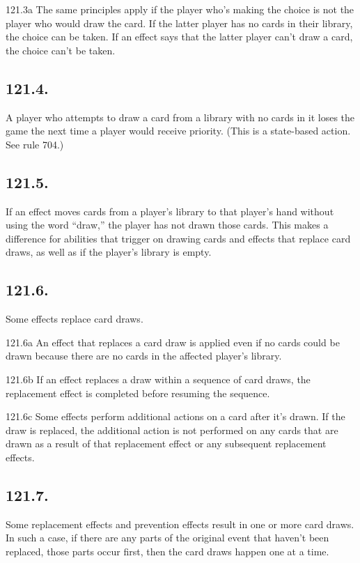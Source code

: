 121.3a The same principles apply if the player who’s making the choice is not the player who would draw the card. If the latter player has no cards in their library, the choice can be taken. If an effect says that the latter player can’t draw a card, the choice can’t be taken.

\subsection*{121.4.}
A player who attempts to draw a card from a library with no cards in it loses the game the next time a player would receive priority. (This is a state-based action. See rule 704.)

\subsection*{121.5.}
If an effect moves cards from a player’s library to that player’s hand without using the word “draw,” the player has not drawn those cards. This makes a difference for abilities that trigger on drawing cards and effects that replace card draws, as well as if the player’s library is empty.

\subsection*{121.6.}
Some effects replace card draws.

121.6a An effect that replaces a card draw is applied even if no cards could be drawn because there are no cards in the affected player’s library.

121.6b If an effect replaces a draw within a sequence of card draws, the replacement effect is completed before resuming the sequence.

121.6c Some effects perform additional actions on a card after it’s drawn. If the draw is replaced, the additional action is not performed on any cards that are drawn as a result of that replacement effect or any subsequent replacement effects.

\subsection*{121.7.}
Some replacement effects and prevention effects result in one or more card draws. In such a case, if there are any parts of the original event that haven’t been replaced, those parts occur first, then the card draws happen one at a time.


